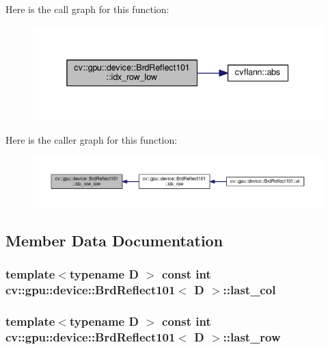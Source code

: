 Here is the call graph for this function\-:\nopagebreak
\begin{figure}[H]
\begin{center}
\leavevmode
\includegraphics[width=338pt]{structcv_1_1gpu_1_1device_1_1BrdReflect101_ae1bd65c3c88e3fef0299e1a7bd6291a2_cgraph}
\end{center}
\end{figure}




Here is the caller graph for this function\-:\nopagebreak
\begin{figure}[H]
\begin{center}
\leavevmode
\includegraphics[width=350pt]{structcv_1_1gpu_1_1device_1_1BrdReflect101_ae1bd65c3c88e3fef0299e1a7bd6291a2_icgraph}
\end{center}
\end{figure}




\subsection{Member Data Documentation}
\hypertarget{structcv_1_1gpu_1_1device_1_1BrdReflect101_abbb6905ce1697878e411d7ede5d4c5e9}{
\subsubsection[{last\-\_\-col}]{\setlength{\rightskip}{0pt plus 5cm}template$<$typename D $>$ const int {\bf cv\-::gpu\-::device\-::\-Brd\-Reflect101}$<$ D $>$\-::last\-\_\-col}}\label{structcv_1_1gpu_1_1device_1_1BrdReflect101_abbb6905ce1697878e411d7ede5d4c5e9}
\hypertarget{structcv_1_1gpu_1_1device_1_1BrdReflect101_a84c09f5cd2cdefae21bbde8e0dec32ec}{
\subsubsection[{last\-\_\-row}]{\setlength{\rightskip}{0pt plus 5cm}template$<$typename D $>$ const int {\bf cv\-::gpu\-::device\-::\-Brd\-Reflect101}$<$ D $>$\-::last\-\_\-row}}\label{structcv_1_1gpu_1_1device_1_1BrdReflect101_a84c09f5cd2cdefae21bbde8e0dec32ec}


